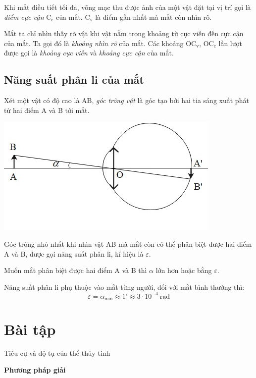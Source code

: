 Khi mắt điều tiết tối đa, võng mạc thu được ảnh của một vật đặt tại vị trí  gọi là \textit{điểm cực cận} $\text{C}_\text{c}$ của mắt. $\text{C}_\text{v}$ là điểm gần nhất mà mắt còn nhìn rõ. 

Mắt ta chỉ nhìn thấy rõ vật khi vật nằm trong khoảng từ cực viễn đến cực cận của mắt. Ta gọi đó là \textit{khoảng nhìn rõ} của mắt. Các khoảng $\text{O}\text{C}_\text{v}$, $\text{OC}_\text{c}$ lần lượt được gọi là \textit{khoảng cực viễn} và  \textit{khoảng cực cận }của mắt.

\subsection{Năng suất phân li của mắt}
Xét một vật có độ cao là AB, \textit{góc trông vật} là góc tạo bởi hai tia sáng xuất phát từ hai điểm A và B tới mắt.
\begin{center}
	\includegraphics[scale=0.8]{../figs/VN11-PH-40-L-028-2-h35.jpg}
\end{center}

Góc trông nhỏ nhất khi nhìn vật AB mà mắt còn có thể phân biệt được hai điểm A và B, được gọi năng suất phân li, kí hiệu là $\varepsilon$.

Muốn mắt phân biệt được hai điểm A và B thì $\alpha$ lớn hơn hoặc bằng $\varepsilon$.

Năng suất phân li phụ thuộc vào mắt từng người, đối với mắt bình thường thì: 
\begin{equation}
\varepsilon=\alpha_{\text{min}}\approx 1'\approx 3\cdot 10^{-4}\ \text{rad}
\end{equation}



\section{Bài tập }
\begin{dang}{Tiêu cự và độ tụ của thể thủy tinh}
\end{dang}
\textbf{Phương pháp giải}

